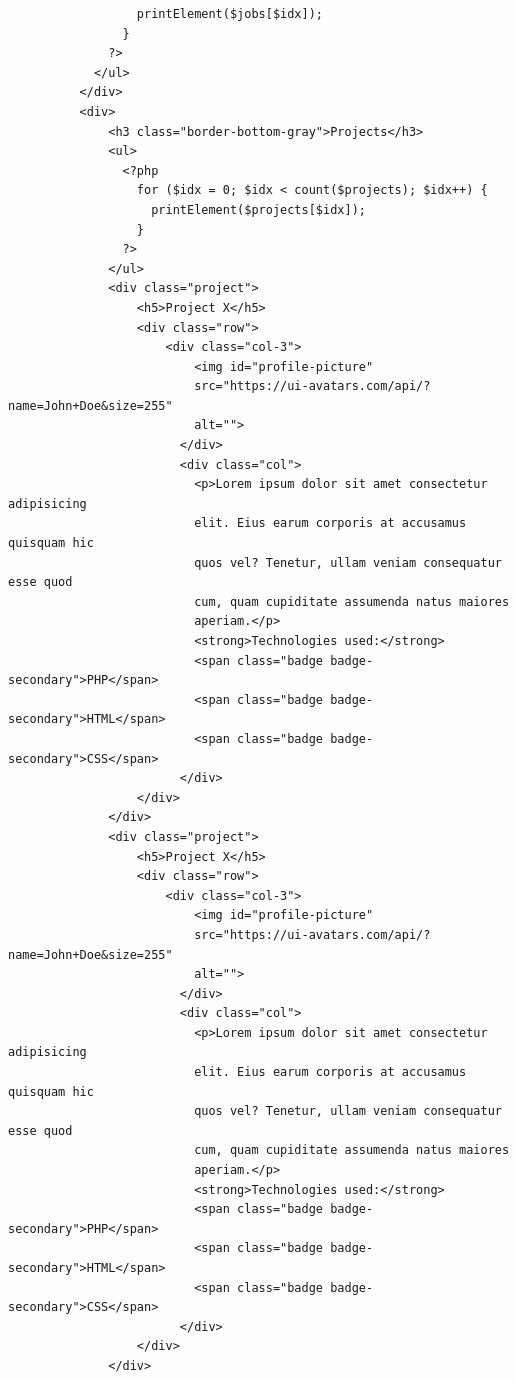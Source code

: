 \documentclass{article}
\begin{document}
\begin{verbatim}
                  printElement($jobs[$idx]);
                }
              ?>
            </ul>
          </div>
          <div>
              <h3 class="border-bottom-gray">Projects</h3>
              <ul>
                <?php
                  for ($idx = 0; $idx < count($projects); $idx++) {
                    printElement($projects[$idx]);
                  }
                ?>
              </ul>
              <div class="project">
                  <h5>Project X</h5>
                  <div class="row">
                      <div class="col-3">
                          <img id="profile-picture"
                          src="https://ui-avatars.com/api/?name=John+Doe&size=255"
                          alt="">
                        </div>
                        <div class="col">
                          <p>Lorem ipsum dolor sit amet consectetur adipisicing
                          elit. Eius earum corporis at accusamus quisquam hic
                          quos vel? Tenetur, ullam veniam consequatur esse quod
                          cum, quam cupiditate assumenda natus maiores
                          aperiam.</p>
                          <strong>Technologies used:</strong>
                          <span class="badge badge-secondary">PHP</span>
                          <span class="badge badge-secondary">HTML</span>
                          <span class="badge badge-secondary">CSS</span>
                        </div>
                  </div>
              </div>
              <div class="project">
                  <h5>Project X</h5>
                  <div class="row">
                      <div class="col-3">
                          <img id="profile-picture"
                          src="https://ui-avatars.com/api/?name=John+Doe&size=255"
                          alt="">
                        </div>
                        <div class="col">
                          <p>Lorem ipsum dolor sit amet consectetur adipisicing
                          elit. Eius earum corporis at accusamus quisquam hic
                          quos vel? Tenetur, ullam veniam consequatur esse quod
                          cum, quam cupiditate assumenda natus maiores
                          aperiam.</p>
                          <strong>Technologies used:</strong>
                          <span class="badge badge-secondary">PHP</span>
                          <span class="badge badge-secondary">HTML</span>
                          <span class="badge badge-secondary">CSS</span>
                        </div>
                  </div>
              </div>

\end{verbatim}
\end{document}
